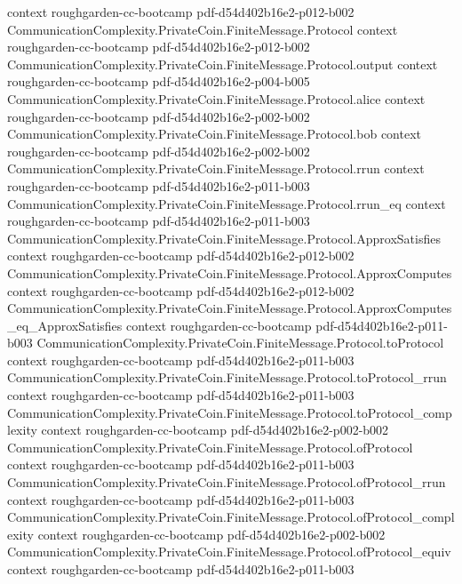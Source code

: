 \begin{theorem}
  {context}
  {roughgarden-cc-bootcamp}
  {pdf-d54d402b16e2-p012-b002}
\proofstep
  {CommunicationComplexity.PrivateCoin.FiniteMessage.Protocol}
  {context}
  {roughgarden-cc-bootcamp}
  {pdf-d54d402b16e2-p012-b002}
\proofstep
  {CommunicationComplexity.PrivateCoin.FiniteMessage.Protocol.output}
  {context}
  {roughgarden-cc-bootcamp}
  {pdf-d54d402b16e2-p004-b005}
\proofstep
  {CommunicationComplexity.PrivateCoin.FiniteMessage.Protocol.alice}
  {context}
  {roughgarden-cc-bootcamp}
  {pdf-d54d402b16e2-p002-b002}
\proofstep
  {CommunicationComplexity.PrivateCoin.FiniteMessage.Protocol.bob}
  {context}
  {roughgarden-cc-bootcamp}
  {pdf-d54d402b16e2-p002-b002}
\proofstep
  {CommunicationComplexity.PrivateCoin.FiniteMessage.Protocol.rrun}
  {context}
  {roughgarden-cc-bootcamp}
  {pdf-d54d402b16e2-p011-b003}
\proofstep
  {CommunicationComplexity.PrivateCoin.FiniteMessage.Protocol.rrun_eq}
  {context}
  {roughgarden-cc-bootcamp}
  {pdf-d54d402b16e2-p011-b003}
\proofstep
  {CommunicationComplexity.PrivateCoin.FiniteMessage.Protocol.ApproxSatisfies}
  {context}
  {roughgarden-cc-bootcamp}
  {pdf-d54d402b16e2-p012-b002}
\proofstep
  {CommunicationComplexity.PrivateCoin.FiniteMessage.Protocol.ApproxComputes}
  {context}
  {roughgarden-cc-bootcamp}
  {pdf-d54d402b16e2-p012-b002}
\proofstep
  {CommunicationComplexity.PrivateCoin.FiniteMessage.Protocol.ApproxComputes_eq_ApproxSatisfies}
  {context}
  {roughgarden-cc-bootcamp}
  {pdf-d54d402b16e2-p011-b003}
\proofstep
  {CommunicationComplexity.PrivateCoin.FiniteMessage.Protocol.toProtocol}
  {context}
  {roughgarden-cc-bootcamp}
  {pdf-d54d402b16e2-p011-b003}
\proofstep
  {CommunicationComplexity.PrivateCoin.FiniteMessage.Protocol.toProtocol_rrun}
  {context}
  {roughgarden-cc-bootcamp}
  {pdf-d54d402b16e2-p011-b003}
\proofstep
  {CommunicationComplexity.PrivateCoin.FiniteMessage.Protocol.toProtocol_complexity}
  {context}
  {roughgarden-cc-bootcamp}
  {pdf-d54d402b16e2-p002-b002}
\proofstep
  {CommunicationComplexity.PrivateCoin.FiniteMessage.Protocol.ofProtocol}
  {context}
  {roughgarden-cc-bootcamp}
  {pdf-d54d402b16e2-p011-b003}
\proofstep
  {CommunicationComplexity.PrivateCoin.FiniteMessage.Protocol.ofProtocol_rrun}
  {context}
  {roughgarden-cc-bootcamp}
  {pdf-d54d402b16e2-p011-b003}
\proofstep
  {CommunicationComplexity.PrivateCoin.FiniteMessage.Protocol.ofProtocol_complexity}
  {context}
  {roughgarden-cc-bootcamp}
  {pdf-d54d402b16e2-p002-b002}
\proofstep
  {CommunicationComplexity.PrivateCoin.FiniteMessage.Protocol.ofProtocol_equiv}
  {context}
  {roughgarden-cc-bootcamp}
  {pdf-d54d402b16e2-p011-b003}

\end{theorem}
